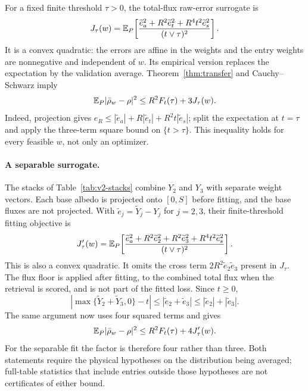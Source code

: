 For a fixed finite threshold $\tau>0$, the total-flux raw-error surrogate is
\begin{equation}\label{eq:Jtau}
J_\tau(w)=\mathbb{E}_P\!\left[
\frac{\widetilde e_a^2+R^2\widetilde e_t^2+R^4t^2\widetilde e_s^2}
     {(t\vee\tau)^2}\right].
\end{equation}
It is a convex quadratic: the errors are affine in the weights and the entry weights
are nonnegative and independent of $w$. Its empirical version replaces the expectation
by the validation average. Theorem~\ref{thm:transfer} and Cauchy--Schwarz imply
\begin{equation}\label{eq:Jtau-bound}
\mathbb{E}_P|\bar\rho_w-\rho|^2\le R^2F_t(\tau)+3J_\tau(w).
\end{equation}
Indeed, projection gives
$e_R\le|\widetilde e_a|+R|\widetilde e_t|+R^2t|\widetilde e_s|$; split the
expectation at $t=\tau$ and apply the three-term square bound on $\{t>\tau\}$.
This inequality holds for every feasible $w$, not only an optimizer.

\paragraph{A separable surrogate.}
The stacks of Table~\ref{tab:v2-stacks} combine $Y_2$ and $Y_3$ with separate weight
vectors. Each base albedo is projected onto $[0,S]$ before fitting, and the base fluxes are
not projected. With
$\widetilde e_j=\widetilde Y_j-Y_j$ for $j=2,3$, their finite-threshold fitting objective is
\begin{equation}\label{eq:Jtau-sep}
J'_\tau(w)=\mathbb{E}_P\!\left[
\frac{\widetilde e_a^2+R^2\widetilde e_2^2+R^2\widetilde e_3^2
      +R^4t^2\widetilde e_s^2}{(t\vee\tau)^2}\right].
\end{equation}
This is also a convex quadratic. It omits the cross term
$2R^2\widetilde e_2\widetilde e_3$ present in $J_\tau$.
The flux floor is applied after fitting, to the combined total flux when the retrieval is
scored, and is not part of the fitted loss.
Since $t\ge0$,
\[
|\max\{\widetilde Y_2+\widetilde Y_3,0\}-t|
 \le|\widetilde e_2+\widetilde e_3|
 \le|\widetilde e_2|+|\widetilde e_3|.
\]
The same argument now uses four squared terms and gives
\begin{equation}\label{eq:Jtau-sep-bound}
\mathbb{E}_P|\bar\rho_w-\rho|^2\le R^2F_t(\tau)+4J'_\tau(w).
\end{equation}
For the separable fit the factor is therefore four rather than three.
Both statements require the physical hypotheses on the distribution being averaged;
full-table statistics that include entries outside those hypotheses are not certificates
of either bound.

